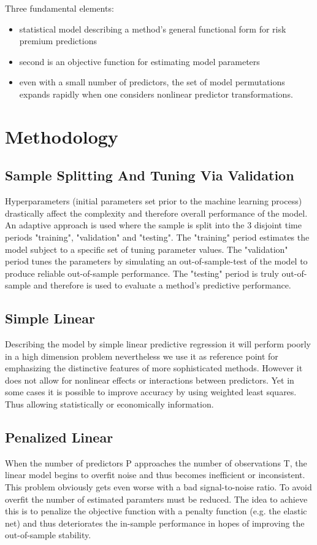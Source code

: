 \documentclass{article}
\begin{document}
Three fundamental elements:
\begin{itemize}
\item statistical model describing a method’s general functional form for risk premium
predictions
\item second is an objective function for estimating model parameters
\item even with a small number of predictors, the set of model permutations expands rapidly when one considers nonlinear predictor
transformations.
\end{itemize}

\section{Methodology}

\subsection{Sample Splitting And Tuning Via Validation}
	Hyperparameters (initial parameters set prior to the machine learning process)
	drastically affect the complexity and therefore overall performance of the model.
	An adaptive approach is used where the sample is split into the 3 disjoint time periods
	"training", "validation" and "testing". The "training" period estimates the model
	subject to a specific set of tuning parameter values. The "validation" period
	tunes the parameters by simulating an out-of-sample-test of the model
	to produce reliable out-of-sample performance. The "testing" period is truly
	out-of-sample and therefore is used to evaluate a method’s predictive performance.

\subsection{Simple Linear}
	Describing the model by simple linear predictive regression it will perform poorly in a high
	dimension problem nevertheless we use it as reference point for emphasizing the distinctive
	features of more sophisticated methods.
	However it does not allow for nonlinear effects or interactions between predictors.
	Yet in some cases it is possible to improve accuracy by using weighted least squares.
	Thus allowing statistically or economically information.

\subsection{Penalized Linear}
	When the number of predictors P approaches the number of observations T,
	the linear model begins to overfit noise and thus becomes inefficient or inconsistent.
	This problem obviously gets even worse with a bad signal-to-noise ratio.
	To avoid overfit the number of estimated paramters must be reduced.
	The idea to achieve this is to penalize the objective function with a penalty
	function (e.g. the elastic net) and thus deteriorates the in-sample performance
	in hopes of improving the out-of-sample stability.
\end{document}
